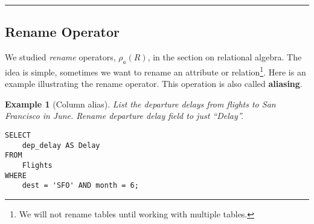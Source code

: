 \documentclass{article}
\newtheorem{example}{Example}
\begin{document}
\hspace{-0.5cm}\rule[0.101in]{\textwidth}{0.0025in}































\subsection*{Rename Operator}

We studied \textit{rename} operators, $\rho_{a}(R)$, in the section on relational algebra. The idea is simple, sometimes we want to rename an attribute or relation\footnote{We will not rename tables until working with multiple tables.}.  Here is an example illustrating the rename operator.  This operation is also called \textbf{aliasing}. 





\begin{example}[Column alias]
List the departure delays from flights to San Francisco in June.  Rename departure delay field to just ``Delay''.  
\end{example}


\begin{lstlisting}[frame=single]  
SELECT 
    dep_delay AS Delay
FROM
    Flights
WHERE
    dest = 'SFO' AND month = 6; 
\end{lstlisting} 
\end{document}
